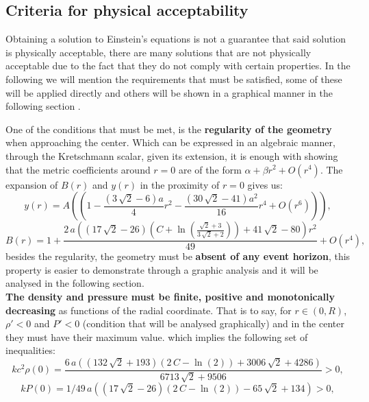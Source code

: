 \documentclass[12pt,onecolumn,a4paper]{article}
\begin{document}
\subsection{Criteria for physical acceptability}
Obtaining a solution to Einstein's equations is not a guarantee that said solution is physically acceptable, there are many solutions that are not physically acceptable \cite{Delgaty} due to the fact that they do not comply with certain properties. In the following we will mention the requirements that must be satisfied, some of these will be applied directly and others will be shown in a graphical manner in the following section \cite{Estevez2019b}. 

One of the conditions that must be met, is the {\bf regularity of the geometry} when approaching the center. Which can be expressed in an algebraic manner, through the Kretschmann scalar, given its extension, it is enough with showing that the metric coefficients around $r=0$ are of the form $\alpha+\beta r^2+O(r^4)$. The expansion of $B(r)$ and $y(r)$  in the proximity of $r=0$ gives us:
$$
y \left( r \right) =A \left( (1-{\frac { \left( 3\,\sqrt {2}-6
 \right) a}{4}}{r}^{2}-{\frac { \left( 30\,\sqrt {2}-41 \right) {a}^{2
}}{16}}{r}^{4}+O \left( {r}^{6} \right) ) \right)
, 
$$
$$
B \left( r \right) =1+{\frac {2\,a \left(  \left( 17\,\sqrt {2}-26
 \right)  \left( C+\ln  \left( {\frac {\sqrt {2}+3}{3\,\sqrt {2}+2}}
 \right)  \right) +41\,\sqrt {2}-80 \right) {r}^{2}}{49}}+O \left( {r}
^{4} \right),
$$
besides the regularity, the geometry must be {\bf absent of any event horizon}, this property is easier to demonstrate through a graphic analysis and it will be analysed in the following section. \\
\noindent
{\bf The density and pressure must be finite, positive and monotonically decreasing} as functions of the radial coordinate. That is to say, for $r\in(0,R)$, $\rho'<0$ and $P'<0$ (condition that will be analysed graphically)  and in the center they must have their maximum value. which implies the following set of inequalities:
\begin{equation}
k{c}^{2}\rho ( 0 ) ={\frac {6\,a \left(  \left( 132\,\sqrt 
{2}+193 \right)  \left( 2\,C-\ln  \left( 2 \right)  \right) +3006\,
\sqrt {2}+4286 \right) }{6713\,\sqrt {2}+9506}}>0,
\label{rho0}
\end{equation}
\begin{equation}
kP( 0 ) =1/49\,a \left(  \left( 17\,\sqrt {2}-26
 \right)  \left( 2\,C-\ln  \left( 2 \right)  \right) -65\,\sqrt {2}+
134 \right) 
>0,
\label{P0}
\end{equation}
\end{document}

